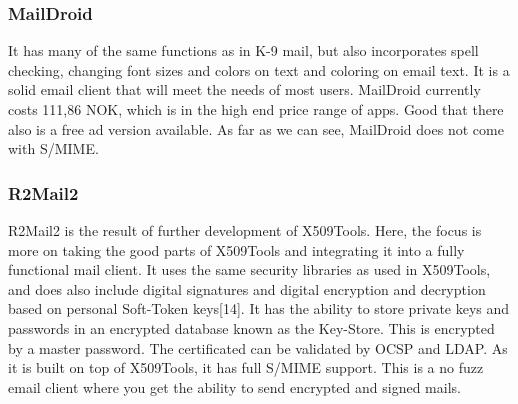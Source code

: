 \subsubsection{MailDroid}
It has many of the same functions as in K-9 mail, but also incorporates spell checking, changing font sizes and colors on text and coloring on email text. It is a solid email client that will meet the needs of most users. MailDroid currently costs 111,86 NOK, which is in the high end price range of apps. Good that there also is a free ad version available. As far as we can see, MailDroid does not come with S/MIME. 

\subsubsection{R2Mail2}
R2Mail2 is the result of further development of X509Tools. Here, the focus is more on taking the good parts of X509Tools and integrating it into a fully functional mail client. It uses the same security libraries as used in X509Tools, and does also include digital signatures and digital encryption and decryption based on personal Soft-Token keys[14]. It has the ability to store private keys and passwords in an encrypted database known as the Key-Store. This is encrypted by a master password. The certificated can be validated by OCSP and LDAP. As it is built on top of X509Tools, it has full S/MIME support. This is a no fuzz email client where you get the ability to send encrypted and signed mails.

